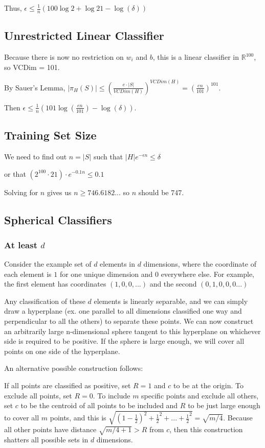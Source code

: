 \documentclass[]{article}
\begin{document}
Thus, $\epsilon \le \frac{1}{n} (100 \log 2 + \log 21 - \log(\delta))$

\subsection{Unrestricted Linear Classifier}
Because there is now no restriction on $w_i$ and $b$, this is a linear classifier in $\mathbb{R}^{100}$, so VCDim = 101.

By Sauer's Lemma, $|\pi_H(S)| \le (\frac{e\cdot |S|}{VCDim(H)})^{VCDim(H)} = (\frac{en}{101})^{101}$.

Then $\epsilon \le \frac{1}{n}(101\log(\frac{en}{101}) - \log(\delta))$.

\subsection{Training Set Size}

We need to find out $n=|S|$ such that $|H|e^{-\epsilon n} \le \delta$

or that $(2^{100} \cdot 21)\cdot e^{-0.1n} \le 0.1$

Solving for $n$ gives us $n \ge 746.6182...$ so $n$ should be 747.

\subsection{Spherical Classifiers}

\subsubsection{At least $d$}
Consider the example set of $d$ elements in $d$ dimensions, where the coordinate of each element is $1$ for one unique dimension and $0$ everywhere else. For example, the first element has coordinates $(1,0,0,...)$ and the second $(0,1,0,0,0...)$

Any classification of these $d$ elements is linearly separable, and we can simply draw a hyperplane (ex. one parallel to all dimensions classified one way and perpendicular to all the others) to separate these points. We can now construct an arbitrarily large n-dimensional sphere tangent to this hyperplane on whichever side is required to be positive. If the sphere is large enough, we will cover all points on one side of the hyperplane.

An alternative possible construction follows:

If all points are classified as positive, set $R=1$ and $c$  to be at the origin. To exclude all points, set $R=0$. To include $m$ specific points and exclude all others, set $c$ to be the centroid of all points to be included and $R$ to be just large enough to cover all $m$ points, and this is $\sqrt{(1-\frac{1}{2})^2 + \frac{1}{2}^2 + ... + \frac{1}{2}^2} = \sqrt{m/4}$. Because all other points have distance $\sqrt{m/4+1} > R$ from $c$, then this construction shatters all possible sets in $d$ dimensions.
\end{document}
